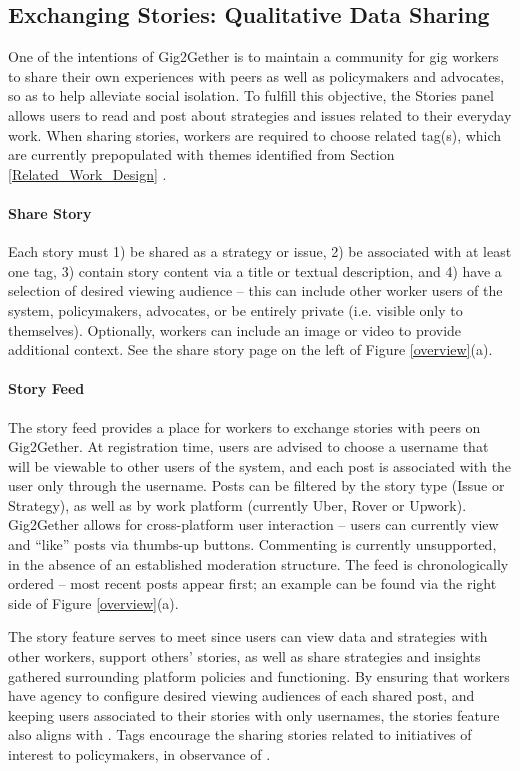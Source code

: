 \subsection{Exchanging Stories: Qualitative Data Sharing}
One of the intentions of Gig2Gether is to maintain a community for gig workers to share their own experiences with peers as well as policymakers and advocates, so as to help alleviate social isolation. To fulfill this objective, the Stories panel allows users to read and post about strategies and issues related to their everyday work. When sharing stories, workers are required to choose related tag(s), which are currently prepopulated with themes identified from Section \ref{Related_Work_Design} .


\paragraph{Share Story} \label{share_story}
Each story must 1) be shared as a strategy or issue, 2) be associated with at least one tag, 3) contain story content via a title or textual description, and 4) have a selection of desired viewing audience -- this can include other worker users of the system, policymakers, advocates, or be entirely private (i.e. visible only to themselves). Optionally, workers can include an image or video to provide additional context. See the share story page on the left of Figure \ref{overview}(a).

\paragraph{Story Feed} The story feed provides a place for workers to exchange stories with peers on Gig2Gether. 
At registration time, users are advised to choose a username that will be viewable to other users of the system, and each post is associated with the user only through the username. Posts can be filtered by the story type (Issue or Strategy), as well as by work platform (currently Uber, Rover or Upwork). Gig2Gether allows for cross-{platform} user interaction -- users can currently view and ``like'' posts via thumbs-up buttons. Commenting is currently unsupported, in the absence of an established moderation structure.
The feed is chronologically ordered -- most recent posts appear first; an example can be found via the right side of Figure \ref{overview}(a).

The story feature serves to meet  since users can view data and strategies with other workers, support others' stories, as well as share strategies and insights gathered surrounding platform policies and functioning. 
By ensuring that workers have agency to configure desired viewing audiences of each shared post, and keeping users associated to their stories with only usernames, the stories feature also aligns with . Tags encourage the sharing stories related to initiatives of interest to policymakers, in observance of .


